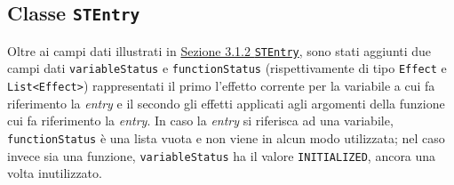 \documentclass[../report.tex]{subfiles}
\begin{document}
\subsection[Classe STEntry]{Classe \texttt{STEntry}}\label{ss:stentry-effetti}
Oltre ai campi dati illustrati in \hyperref[ss:stentry]{Sezione 3.1.2 \texttt{STEntry}}, sono stati aggiunti due campi dati \verb|variableStatus| e \verb|functionStatus| (rispettivamente di tipo \verb|Effect| e \verb|List<Effect>|) rappresentati il primo l'effetto corrente per la variabile a cui fa riferimento la \textit{entry} e il secondo gli effetti applicati agli argomenti della funzione cui fa riferimento la \textit{entry}.
In caso la \textit{entry} si riferisca ad una variabile, \verb|functionStatus| è una lista vuota e non viene in alcun modo utilizzata; nel caso invece sia una funzione, \verb|variableStatus| ha il valore \verb|INITIALIZED|, ancora una volta inutilizzato.
\end{document}
